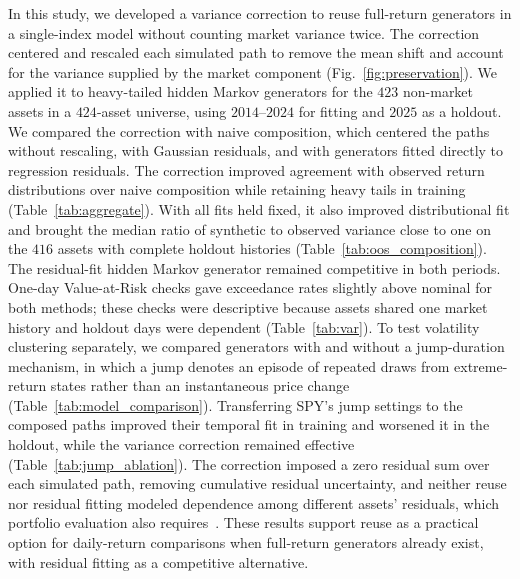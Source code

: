 In this study, we developed a variance correction to reuse full-return
generators in a single-index model without counting market variance
twice. The correction centered and rescaled each simulated path to
remove the mean shift and account for the variance supplied by the
market component
(Fig.~\ref{fig:preservation}). We applied it to heavy-tailed hidden
Markov generators for the $423$ non-market assets in a $424$-asset
universe, using $2014$--$2024$ for fitting and $2025$ as a holdout.
We compared the correction with naive composition, which centered the
paths without rescaling, with Gaussian residuals, and with generators
fitted directly to regression residuals. The correction improved
agreement with observed return distributions over naive composition
while retaining heavy tails in training (Table~\ref{tab:aggregate}).
With all fits held fixed, it also improved distributional fit and
brought the median ratio of synthetic to observed variance close to
one on the $416$ assets with complete holdout histories
(Table~\ref{tab:oos_composition}). The residual-fit hidden Markov
generator remained competitive in both periods. One-day Value-at-Risk
checks gave exceedance rates slightly above nominal for both methods;
these checks were descriptive because assets shared one market history
and holdout days were dependent (Table~\ref{tab:var}). To test
volatility clustering separately, we compared generators with and
without a jump-duration mechanism, in which a jump denotes an episode
of repeated draws from extreme-return states rather than an
instantaneous price change (Table~\ref{tab:model_comparison}).
Transferring SPY's jump settings to the composed paths improved their
temporal fit in training and worsened it in the holdout, while the
variance correction remained effective (Table~\ref{tab:jump_ablation}).
The correction imposed a zero residual sum over each simulated path,
removing cumulative residual uncertainty, and neither reuse nor residual
fitting modeled dependence among different assets' residuals, which
portfolio evaluation also requires~\cite{embrechtsMcNeilStraumann2002,
boucheyNemtchinovWong2015}. These results support reuse as a practical
option for daily-return comparisons when full-return generators
already exist, with residual fitting as a competitive alternative.
